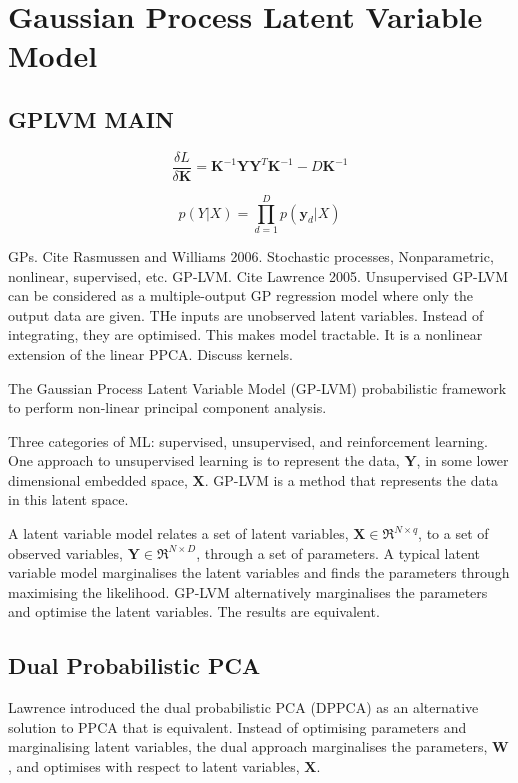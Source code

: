 \documentclass[ %
                    author={Dillon Keith Diep},
                supervisor={Dr. Carl Henrik Ek},
                    degree={MEng},
                     title={Assisted Content Generation for 3D Hair Geometry},
                  subtitle={[INCOMPLETE DRAFT, CONTAINS NOTES FROM RESEARCH]},
                      type={Research},
                      year={2014} ]{dissertation}
\begin{document}
\section{Gaussian Process Latent Variable Model}
\subsection{GPLVM MAIN}
\begin{equation} \label{lvm:linear}
	\frac{\delta L}{\delta\mathbf{K}}=\mathbf{K}^{-1}\mathbf{YY}^T\mathbf{K}^{-1}-D\mathbf{K}^{-1}
\end{equation}

\begin{equation} \label{gplvm:likelihood}
	p(Y|X)=\prod^D_{d=1}p(\mathbf{y}_d|X)
\end{equation}

\vspace{5cm}



GPs. Cite Rasmussen and Williams 2006. Stochastic processes, Nonparametric, nonlinear, supervised, etc.
GP-LVM. Cite Lawrence 2005. Unsupervised\cite{gplvm}
GP-LVM can be considered as a multiple-output GP regression model where only the output data are given.
THe inputs are unobserved latent variables.
Instead of integrating, they are optimised. This makes model tractable. It is a nonlinear extension of the linear PPCA. 
Discuss kernels.

The Gaussian Process Latent Variable Model (GP-LVM) probabilistic framework to perform non-linear principal component analysis. 

Three categories of ML: supervised, unsupervised, and reinforcement learning.
One approach to unsupervised learning is to represent the data, $\mathbf{Y}$, in some lower dimensional embedded space, $\mathbf{X}$. GP-LVM is a method that represents the data in this latent space.

A latent variable model relates a set of latent variables, $\mathbf{X}\in \Re^{N\times q}$, to a set of observed variables, $\mathbf{Y}\in \Re^{N\times D}$, through a set of parameters. A typical latent variable model marginalises the latent variables and finds the parameters through maximising the likelihood. GP-LVM alternatively marginalises the parameters and optimise the latent variables. The results are equivalent.

\subsection{Dual Probabilistic PCA}
Lawrence introduced the dual probabilistic PCA (DPPCA) as an alternative solution to PPCA that is equivalent. Instead of optimising parameters and marginalising latent variables, the dual approach marginalises the parameters, $\mathbf{W}$, and optimises with respect to latent variables, $\mathbf{X}$.
\end{document}
